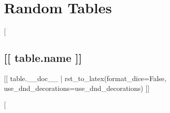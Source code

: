 \section*{Random Tables}

[%
\subsection*{[[ table.name ]]}

[[ table.__doc__ | rst_to_latex(format_dice=False, use_dnd_decorations=use_dnd_decorations) ]]

[%
